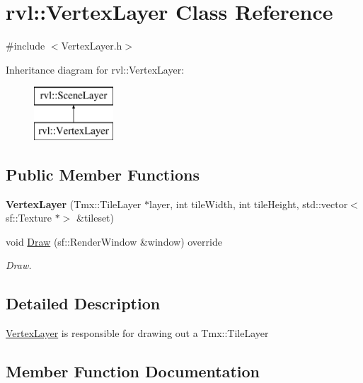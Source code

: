 \hypertarget{classrvl_1_1_vertex_layer}{}\section{rvl\+:\+:Vertex\+Layer Class Reference}
\label{classrvl_1_1_vertex_layer}


{\ttfamily \#include $<$Vertex\+Layer.\+h$>$}

Inheritance diagram for rvl\+:\+:Vertex\+Layer\+:\begin{figure}[H]
\begin{center}
\leavevmode
\includegraphics[height=2.000000cm]{classrvl_1_1_vertex_layer}
\end{center}
\end{figure}
\subsection*{Public Member Functions}
\begin{DoxyCompactItemize}
\item 
\mbox{\label{classrvl_1_1_vertex_layer_aa6b21bdf5910c1afba2b6080f7555d64}} 
{\bfseries Vertex\+Layer} (Tmx\+::\+Tile\+Layer $\ast$layer, int tile\+Width, int tile\+Height, std\+::vector$<$ sf\+::\+Texture $\ast$$>$ \&tileset)
\item 
void \hyperlink{classrvl_1_1_vertex_layer_aa6c20822af0bcbf0c57329348b92c0b4}{Draw} (sf\+::\+Render\+Window \&window) override
\begin{DoxyCompactList}\small\item\em Draw. \end{DoxyCompactList}\end{DoxyCompactItemize}


\subsection{Detailed Description}
\hyperlink{classrvl_1_1_vertex_layer}{Vertex\+Layer} is responsible for drawing out a Tmx\+::\+Tile\+Layer 

\subsection{Member Function Documentation}
\mbox{\label{classrvl_1_1_vertex_layer_aa6c20822af0bcbf0c57329348b92c0b4}} 
